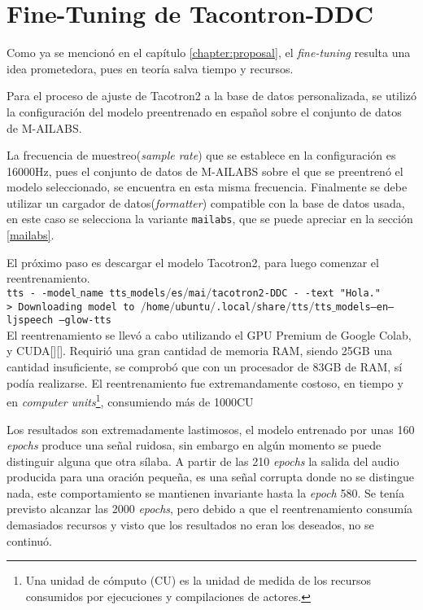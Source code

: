 \section{Fine-Tuning de Tacontron-DDC} \label{tacotron2}
Como ya se mencionó en el capítulo \ref{chapter:proposal}, el \textit{fine-tuning} resulta una idea prometedora, pues en teoría salva tiempo y recursos.

Para el proceso de ajuste de Tacotron2 a la base de datos personalizada, se utilizó la configuración del modelo preentrenado en español sobre el conjunto de datos de M-AILABS. 

La frecuencia de muestreo(\textit{sample rate}) que se establece en la configuración es 16000Hz, pues el conjunto de datos de M-AILABS sobre el que se preentrenó el modelo seleccionado, se encuentra en esta misma frecuencia. Finalmente se debe utilizar un cargador de datos(\textit{formatter}) compatible con la base de datos usada, en este caso se selecciona la variante \texttt{mailabs}, que se puede apreciar en la sección \ref{mailabs}.

El próximo paso es descargar el modelo Tacotron2, para luego comenzar el reentrenamiento.\\

\texttt{tts - -model$\_$name tts$\_$models$/$es$/$mai$/$tacotron2-DDC - -text "Hola."}\\

\texttt{> Downloading model to $/$home$/$ubuntu$/$.local$/$share$/$tts$/$tts$\_$models--en--ljspeech
	--glow-tts}\\

El reentrenamiento se llevó a cabo utilizando el GPU Premium de Google Colab, y CUDA[\cite{cuda}][\cite{cuda1}]. Requirió una gran cantidad de memoria RAM, siendo 25GB una cantidad insuficiente, se comprobó que con un procesador de 83GB de RAM, sí podía realizarse. El reentrenamiento fue extremandamente costoso, en tiempo y en \textit{computer units}\footnote{Una unidad de cómputo (CU) es la unidad de medida de los recursos consumidos por ejecuciones y compilaciones de actores.}, consumiendo más de 1000CU

Los resultados son extremadamente lastimosos, el modelo entrenado por unas 160 \textit{epochs} produce una señal ruidosa, sin embargo en algún momento se puede distinguir alguna que otra sílaba. A partir de las 210 \textit{epochs} la salida del audio producida para una oración pequeña, es una señal corrupta donde no se distingue nada, este comportamiento se mantienen invariante hasta la \textit{epoch} 580. Se tenía previsto alcanzar las 2000 \textit{epochs}, pero debido a que el reentrenamiento consumía demasiados recursos y visto que los resultados no eran los deseados, no se continuó. 

